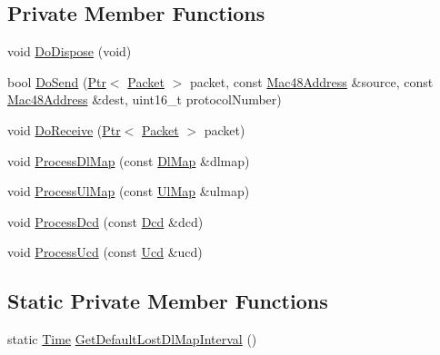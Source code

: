 \subsection*{Private Member Functions}
\begin{DoxyCompactItemize}
\item 
void \hyperlink{classns3_1_1SubscriberStationNetDevice_ab96e90bdc3192e51179510a4a1f59c51}{Do\+Dispose} (void)
\item 
bool \hyperlink{classns3_1_1SubscriberStationNetDevice_a345ffddc3bb25991846652c4c58c7b8b}{Do\+Send} (\hyperlink{classns3_1_1Ptr}{Ptr}$<$ \hyperlink{classns3_1_1Packet}{Packet} $>$ packet, const \hyperlink{classns3_1_1Mac48Address}{Mac48\+Address} \&source, const \hyperlink{classns3_1_1Mac48Address}{Mac48\+Address} \&dest, uint16\+\_\+t protocol\+Number)
\item 
void \hyperlink{classns3_1_1SubscriberStationNetDevice_a2cdd421837891adea005eb7cde668a1f}{Do\+Receive} (\hyperlink{classns3_1_1Ptr}{Ptr}$<$ \hyperlink{classns3_1_1Packet}{Packet} $>$ packet)
\item 
void \hyperlink{classns3_1_1SubscriberStationNetDevice_a9dec129105278f77b592afe35a189bda}{Process\+Dl\+Map} (const \hyperlink{classns3_1_1DlMap}{Dl\+Map} \&dlmap)
\item 
void \hyperlink{classns3_1_1SubscriberStationNetDevice_adde622bba63e7642c23839812c95e391}{Process\+Ul\+Map} (const \hyperlink{classns3_1_1UlMap}{Ul\+Map} \&ulmap)
\item 
void \hyperlink{classns3_1_1SubscriberStationNetDevice_a9ea614322ab68e822ccde4c19c7a16e1}{Process\+Dcd} (const \hyperlink{classns3_1_1Dcd}{Dcd} \&dcd)
\item 
void \hyperlink{classns3_1_1SubscriberStationNetDevice_a6bfed3721385a96f7e2e03bcf08eedac}{Process\+Ucd} (const \hyperlink{classns3_1_1Ucd}{Ucd} \&ucd)
\end{DoxyCompactItemize}
\subsection*{Static Private Member Functions}
\begin{DoxyCompactItemize}
\item 
static \hyperlink{classns3_1_1Time}{Time} \hyperlink{classns3_1_1SubscriberStationNetDevice_aa4ca2ee7bde21362c25de621b4718174}{Get\+Default\+Lost\+Dl\+Map\+Interval} ()
\end{DoxyCompactItemize}
